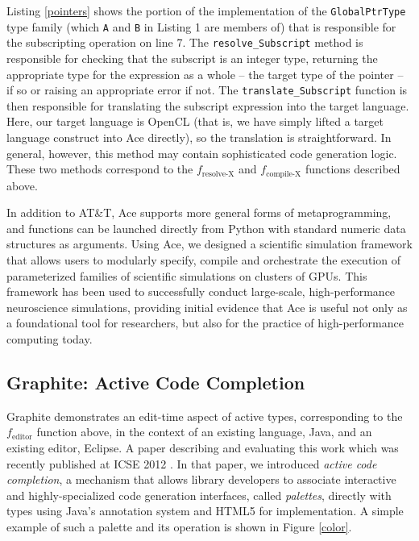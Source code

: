 Listing \ref{pointers} shows the portion of the implementation of the \verb|GlobalPtrType| type family (which \verb|A| and \verb|B| in Listing 1 are members of) that is responsible for the subscripting operation on line 7. The \verb|resolve_Subscript| method is responsible for checking that the subscript is an integer type, returning the appropriate type for the expression as a whole -- the target type of the pointer -- if so or raising an appropriate error if not. The \verb|translate_Subscript| function is then responsible for translating the subscript expression into the target language. Here, our target language is OpenCL (that is, we have simply lifted a target language construct into Ace directly), so the translation is straightforward. In general, however, this method may contain sophisticated code generation logic. These two methods correspond to the $f_{\text{resolve-X}}$ and $f_{\text{compile-X}}$ functions described above.
 
In addition to AT\&T, Ace supports more general forms of metaprogramming, and functions can be launched directly from Python with standard numeric data structures as arguments. Using Ace, we designed a scientific simulation framework that allows users to modularly specify, compile and orchestrate the execution of parameterized families of scientific simulations on clusters of GPUs. This framework has been used to successfully conduct large-scale, high-performance neuroscience simulations, providing initial evidence that Ace is useful not only as a foundational tool for researchers, but also for the practice of high-performance computing today.

\subsection{Graphite: Active Code Completion}\label{graphite}
Graphite demonstrates an edit-time aspect of active types, corresponding to the $f_{\text{editor}}$ function above, in the context of an existing language, Java, and an existing editor, Eclipse. A paper describing and evaluating this work which was recently published at ICSE 2012 \cite{omar2012active}. 
In that paper, we introduced {\em active code completion}, a mechanism that allows library developers to associate interactive and highly-specialized code generation interfaces, called {\em palettes}, directly with types using Java's annotation system and HTML5 for implementation. A simple example of such a palette and its operation is shown in Figure \ref{color}. 

